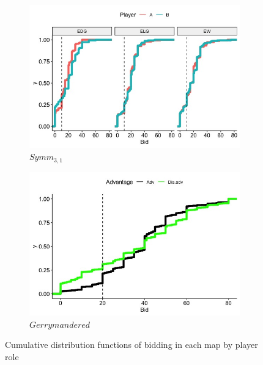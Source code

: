 \documentclass[AER]{AEA}
\begin{document}
\begin{figure}
    \begin{subfigure}[t]{0.45\textwidth}
        \centering
        \includegraphics[scale = .35]{symm_3_1_cdf.jpeg} 
        \caption{$Symm_{3,1}$} \label{fig:symm_3_1_cdf}
    \end{subfigure}
    \hfill
    \begin{subfigure}[t]{0.45\textwidth}
        \centering
        \includegraphics[scale = .35]{adv_vs_disadv_cdf.jpeg} 
        \caption{$Gerrymandered$} \label{fig:adv_vs_disadv_cdf}
    \end{subfigure}
    \caption{Cumulative distribution functions of bidding in each map by player role}
\label{fig:cdfs}
\end{figure}
\end{document}
